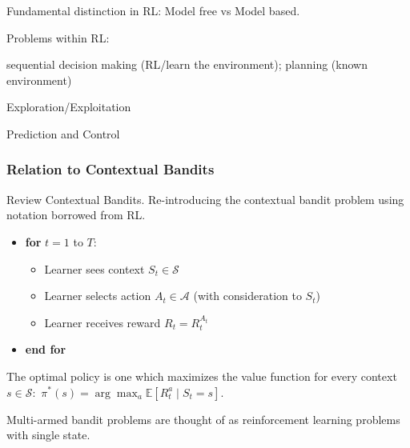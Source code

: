 \documentclass[english]{article}
\begin{document}
\item Fundamental distinction in RL: Model free vs Model based.

\item Problems within RL: 

sequential decision making (RL/learn the environment); planning (known environment)

Exploration/Exploitation

Prediction and Control


\eenum
\subsubsection{Relation to Contextual Bandits}
\benum

\item {Review Contextual Bandits}.
Re-introducing the contextual bandit problem using notation borrowed from RL.
\begin{itemize}
    \item[] \textbf{for} $t = 1$ to $T$:
    \begin{itemize}
        \item[] Learner sees context $S_t \in \mathcal{S}$
        \item[] Learner selects action $A_t \in \mathcal{A}$ (with consideration to $S_t$)
        \item[] Learner receives reward $R_t = R_t^{A_t}$
    \end{itemize}
    \item[] \textbf{end for}
\end{itemize}
The optimal policy is one which maximizes the value function for every context $s \in \mathcal{S}:$ $\pi^*(s) = \arg\max_a \mathbb{E}[R^a_t \mid S_t = s]$.

\medskip
Multi-armed bandit problems are thought of as reinforcement learning problems with single state.


\end{document}
